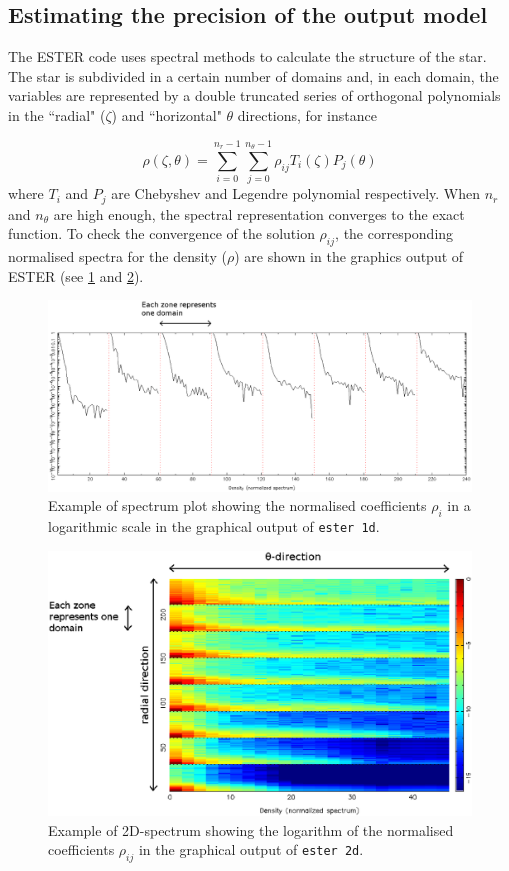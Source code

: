 \subsection{Estimating the precision of the output model}

The ESTER code uses spectral methods to calculate the structure of
the star.  The star is subdivided in a certain number of domains and, in
each domain, the variables are represented by a double truncated series
of orthogonal polynomials in the ``radial" ($\zeta$) and ``horizontal"
$\theta$ directions, for instance

\[\rho(\zeta,\theta)=
\sum_{i=0}^{n_r-1}\sum_{j=0}^{n_\theta-1}\rho_{ij}T_i(\zeta)P_j(\theta)\]
where $T_i$ and $P_j$ are Chebyshev and Legendre polynomial
respectively.
When $n_r$ and $n_\theta$ are high enough, the spectral representation
converges to the exact function.  To check the convergence of
the solution $\rho_{ij}$, the corresponding normalised spectra for
the density ($\rho$) are shown in the graphics output of ESTER (see
\ref{fig:spectrum1d} and \ref{fig:spectrum2d}).

\begin{figure}[H]
\includegraphics[width=\textwidth]{fig/spectrum1d.eps}
\caption{Example of spectrum plot showing the normalised coefficients $\rho_{i}$ in a logarithmic scale
 in the graphical output of {\tt ester 1d}.
\label{fig:spectrum1d}}
\end{figure} 
\begin{figure}[H]
\includegraphics[width=\textwidth]{fig/spectrum2d.eps}
\caption{Example of 2D-spectrum showing the logarithm of the normalised coefficients $\rho_{ij}$ 
in the graphical output of {\tt ester 2d}.
\label{fig:spectrum2d}}
\end{figure}

